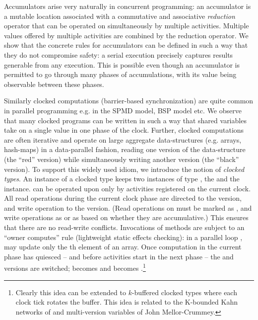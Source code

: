Accumulators arise very naturally in concurrent programming: an
accumulator is a mutable location associated with a commutative and
associative {\em reduction} operator that can be operated on
simultaneously by multiple activities. Multiple values offered by
multiple activities are combined by the reduction operator. We show
that the concrete rules for accumulators can be defined in such a way
that they do not compromise safety: a serial execution precisely
captures results generable from any execution. This is possible even
though an accumulator is permitted to go through many phases of
accumulations, with its value being observable between these phases.

Similarly clocked computations (barrier-based synchronization) are
quite common in parallel programming e.g.{} in the SPMD model, BSP model
etc. We observe that many clocked programs can be written in such a
way that shared variables take on a single value in one phase of the
clock. Further, clocked computations are often iterative and operate
on large aggregate data-structures (e.g.{} arrays, hash-maps) in a
data-parallel fashion, reading one version of the data-structure (the
``red'' version) while simultaneously writing another version (the
 ``black'' version). To support this widely used idiom, we introduce
the notion of {\em clocked types}. An instance  of a  clocked type
 keeps two instances of type , the  and
the  instance.  can be operated upon only by
activities registered on the current clock.  All read operations
during the current clock phase are directed to the  version,
and write operation to the  version. (Read operations on
 must  be marked as , and write operations as
 or as  based on whether they are accumulative.) This ensures that
there are no read-write conflicts. Invocations of 
methods are subject to an ``owner computes'' rule (lightweight static
effects checking): in a parallel loop ,
 may update only the th element of an array.
Once computation in the current phase has quiesced -- and
before activities start in the next phase -- the  and
 versions are switched;  becomes  and
 becomes .\footnote{Clearly this idea can be
  extended to $k$-buffered clocked types where each clock tick rotates
  the buffer. This idea is related to the K-bounded Kahn networks of
\cite{Cohen:2006:NSK:1111320.1111054} and multi-version variables of
John Mellor-Crummey.}

